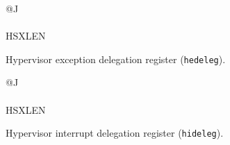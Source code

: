\begin{figure}[h!]
{\footnotesize
\begin{center}
\begin{tabular}{@{}J}
 \\
\hline
{} \\
\hline
HSXLEN \\
\end{tabular}
\end{center}
}
\vspace{-0.1in}
\caption{Hypervisor exception delegation register ({\tt hedeleg}).}
\label{hedelegreg}
\end{figure}

\begin{figure}[h!]
{\footnotesize
\begin{center}
\begin{tabular}{@{}J}
 \\
\hline
{} \\
\hline
HSXLEN \\
\end{tabular}
\end{center}
}
\vspace{-0.1in}
\caption{Hypervisor interrupt delegation register ({\tt hideleg}).}
\label{hidelegreg}
\end{figure}

